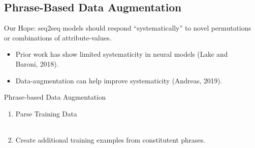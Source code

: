 \subsection{Phrase-Based Data Augmentation}
\begin{frame}
    \subsectionpage
\end{frame}
\begin{frame}

    Our Hope: seq2seq models should respond ``systematically'' to novel permutations or combinations of attribute-values. 

    \begin{itemize}

        \item Prior work has show limited systematicity in neural models (Lake and Baroni, 2018).
        \item Data-augmentation can help improve systematicity (Andreas, 2019).
    \end{itemize}

\end{frame}

\begin{frame}{Phrase-based Data Augmentation}

    \begin{enumerate}
        \item Parse Training Data\\~\\
        \item Create additional training examples from constitutent phrases.
    \end{enumerate}

\end{frame}


